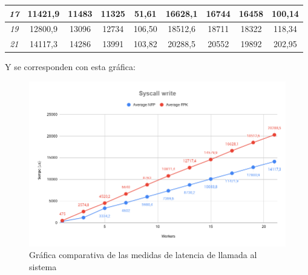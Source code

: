\documentclass[../main.tex]{subfiles}
\begin{document}
\begin{table}[htp]
\begin{tabular}{|c|c|c|c|c|c|c|c|c|}
\textit{17}                          & 11421,9      & 11483        & 11325        & 51,61            & 16628,1      & 16744        & 16458        & 100,14           \\ \hline
\textit{19}                          & 12800,9      & 13096        & 12734        & 106,50           & 18512,6      & 18711        & 18322        & 118,34           \\ \hline
\textit{21}                          & 14117,3      & 14286        & 13991        & 103,82           & 20288,5      & 20552        & 19892        & 202,95           \\ \hline
\end{tabular}
\end{table}

Y se corresponden con esta gráfica:

\begin{figure}[htp]
    \centering
    \includegraphics[width=15cm]{imagenes/graficas/Syscall-write.png}
    \caption{Gráfica comparativa de las medidas de latencia de llamada al sistema}
\end{figure}
\end{document}
